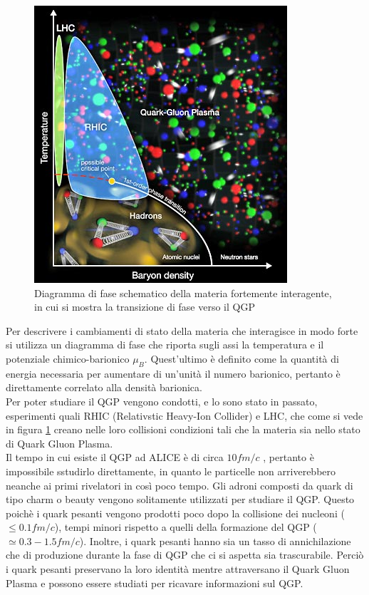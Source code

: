 \begin{figure}[htbp]
        \centering
        \includegraphics[width=0.5\linewidth]{introParticelle/DiagrammaFaseQGP2.jpg}
        \caption{ Diagramma di fase schematico della materia fortemente interagente, in cui si mostra la transizione di fase verso il QGP}
        \label{fig:DiagrammaFaseQCD}
    \end{figure}
    
    
Per descrivere i cambiamenti di stato della materia che interagisce in modo forte si utilizza un diagramma di fase che riporta sugli assi la temperatura e il potenziale chimico-barionico $\mu_B$. Quest'ultimo è definito come la quantità di energia necessaria per aumentare di un'unità il numero barionico, pertanto è direttamente correlato alla densità barionica.
\\Per poter studiare il QGP vengono condotti, e lo sono stato in passato, esperimenti quali RHIC (Relativstic Heavy-Ion Collider) e LHC, che come si vede in figura \ref{fig:DiagrammaFaseQCD} creano nelle loro collisioni condizioni tali che la materia sia nello stato di Quark Gluon Plasma. 
\\Il tempo in cui esiste il QGP ad ALICE è di circa $10 fm/c$ \cite{QCD2}, pertanto è impossibile sstudirlo direttamente, in quanto le particelle non arriverebbero neanche ai primi rivelatori in così poco tempo. Gli adroni composti da quark di tipo charm o beauty vengono solitamente utilizzati per studiare il QGP. Questo poichè i quark pesanti vengono prodotti poco dopo la collisione dei nucleoni ( $\leq 0.1 fm/c$), tempi minori rispetto a quelli della formazione del QGP ($\simeq 0.3 - 1.5 fm/c$). Inoltre, i quark pesanti hanno sia un tasso di annichilazione che di produzione durante la fase di QGP che ci si aspetta sia trascurabile. Perciò i quark pesanti preservano la loro identità mentre attraversano il Quark Gluon Plasma e possono essere studiati per ricavare informazioni sul QGP. \cite{tesi_barbano}


